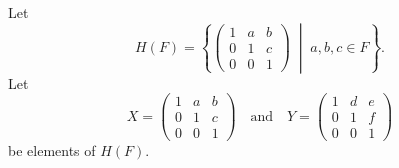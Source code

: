 \label{exercise-heisenberg-intro}
Let
\begin{equation*}
  H(F) = \left\{
    \begin{pmatrix}
      1 & a & b \\
      0 & 1 & c \\
      0 & 0 & 1
    \end{pmatrix}
    \;\middle|\;
    a,b,c\in F
  \right\}.
\end{equation*}
Let
\begin{equation*}
  X =
  \begin{pmatrix}
    1 & a & b \\
    0 & 1 & c \\
    0 & 0 & 1
  \end{pmatrix}
  \quad\text{and}\quad
  Y =
  \begin{pmatrix}
    1 & d & e \\
    0 & 1 & f \\
    0 & 0 & 1
  \end{pmatrix}
\end{equation*}
be elements of $H(F)$.
